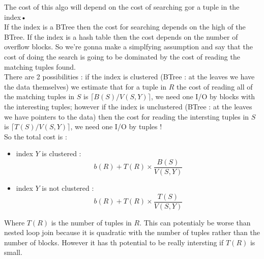 \documentclass[12pt,a4paper]{article}
\begin{document}
The cost of this algo will depend on the cost of searching gor a tuple in the index•\\
If the index is a BTree then the cost for searching depends on the high of the BTree. If the index is a hash table then the cost depends on the number of overflow blocks. So we're gonna make a simplfying assumption and say that the cost of doing the search is going to be dominated by the cost of reading the matching tuples found.\\
There are 2 possibilities : if the index is clustered (BTree : at the leaves we have the data themselves) we estimate that for a tuple in $R$ the cost of reading all of the matching tuples in $S$ is $\lceil B(S) / V(S,Y) \rceil$, we need one I/O by blocks with the interesting tuples; however if the index is unclustered (BTree : at the leaves we have pointers to the data) then the cost for reading the intersting tuples in $S$ is $\lceil T(S) / V(S,Y) \rceil$, we need one I/O by tuples !\\
So the total cost is :
\begin{itemize}
\item index $Y$ is clustered : 
$$b(R) + T(R) \times \dfrac{B(S)}{V(S,Y)}$$
\item index $Y$ is not clustered : 
$$b(R) + T(R) \times \dfrac{T(S)}{V(S,Y)}$$
\end{itemize}
Where $T(R)$ is the number of tuples in $R$. This can potentialy be worse than nested loop join because it is quadratic with the number of tuples rather than the number of blocks. However it has th potential to be really intersting if $T(R)$ is small.
\end{document}
